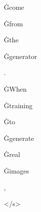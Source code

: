 \documentclass[varwidth]{standalone}
\begin{document}
\begin{CJK*}{UTF8}{gbsn}
{{{\colorbox{red!0.670045}{\strut Ġcome} \colorbox{red!0.9559123}{\strut Ġfrom} \colorbox{red!1.8860523}{\strut Ġthe} \colorbox{red!0.55063224}{\strut Ġgenerator} \colorbox{red!2.5627615}{\strut .} \colorbox{red!1.6725322}{\strut ĠWhen} \colorbox{red!4.178869}{\strut Ġtraining} \colorbox{red!2.6645703}{\strut Ġto} \colorbox{red!2.6087928}{\strut Ġgenerate} \colorbox{red!1.403843}{\strut Ġreal} \colorbox{red!3.8569138}{\strut Ġimages} \colorbox{red!1.5411954}{\strut ,} \colorbox{red!1.257866}{\strut </s>} 
}}}
\end{CJK*}
\end{document}
